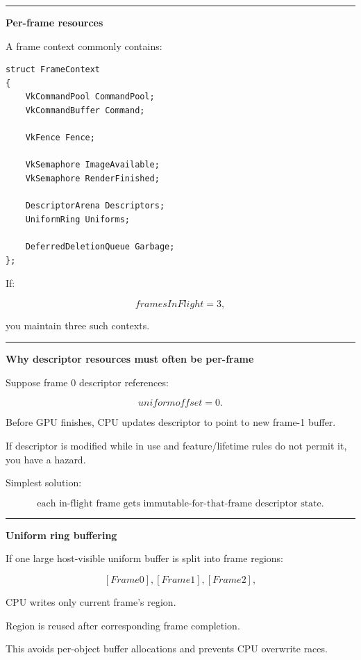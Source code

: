 \begin{center}\rule{0.5\linewidth}{0.5pt}\end{center}

\textbf{Per-frame resources}

A frame context commonly contains:

\begin{verbatim}
struct FrameContext
{
    VkCommandPool CommandPool;
    VkCommandBuffer Command;

    VkFence Fence;

    VkSemaphore ImageAvailable;
    VkSemaphore RenderFinished;

    DescriptorArena Descriptors;
    UniformRing Uniforms;

    DeferredDeletionQueue Garbage;
};
\end{verbatim}

If:

\[
framesInFlight=3,
\]

you maintain three such contexts.

\begin{center}\rule{0.5\linewidth}{0.5pt}\end{center}

\textbf{Why descriptor resources must often be per-frame}

Suppose frame 0 descriptor references:

\[
uniform offset=0.
\]

Before GPU finishes, CPU updates descriptor to point to new frame-1 buffer.

If descriptor is modified while in use and feature/lifetime rules do not permit it, you have a hazard.

Simplest solution:

\[
\boxed{
\text{each in-flight frame gets immutable-for-that-frame descriptor state}.
}
\]

\begin{center}\rule{0.5\linewidth}{0.5pt}\end{center}

\textbf{Uniform ring buffering}

If one large host-visible uniform buffer is split into frame regions:

\[
[Frame0],
[Frame1],
[Frame2],
\]

CPU writes only current frame's region.

Region is reused after corresponding frame completion.

This avoids per-object buffer allocations and prevents CPU overwrite races.

